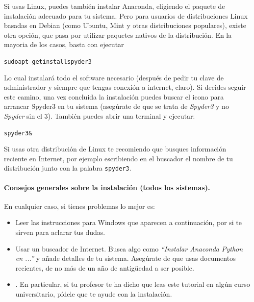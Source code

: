 \documentclass[10pt,a4paper]{article}\usepackage[]{graphicx}\usepackage[]{color}
\makeatletter
\newenvironment{kframe}{%
 \def\at@end@of@kframe{}%
 \ifinner\ifhmode%
  \def\at@end@of@kframe{\end{minipage}}%
  \begin{minipage}{\columnwidth}%
 \fi\fi%
 \def\FrameCommand##1{\hskip\@totalleftmargin \hskip-\fboxsep
 \colorbox{shadecolor}{##1}\hskip-\fboxsep
     \hskip-\linewidth \hskip-\@totalleftmargin \hskip\columnwidth}%
 \MakeFramed {\advance\hsize-\width
   \@totalleftmargin\z@ \linewidth\hsize
   \@setminipage}}%
 {\par\unskip\endMakeFramed%
 \at@end@of@kframe}
\newenvironment{knitrout}{}{} %
\newcounter {cont01}
\makeatother
\begin{document}
Si usas Linux, puedes también instalar Anaconda, eligiendo el paquete de instalación adecuado para tu sistema. Pero para usuarios de distribuciones Linux basadas en Debian (como Ubuntu, Mint y otras distribuciones populares), existe otra opción, que pasa por utilizar  paquetes nativos de la distribución. En la mayoria de los casos, basta con ejecutar
\begin{knitrout}
\color{fgcolor}\begin{kframe}
\begin{alltt}
sudo apt-get install spyder3
\end{alltt}
\end{kframe}
\end{knitrout}
Lo cual instalará todo el software necesario (después de pedir tu clave de administrador y siempre que tengas conexión a internet, claro). Si decides seguir este camino, una vez concluida la instalación puedes buscar el icono para arrancar Spyder3 en tu sistema (asegúrate de que se trata de {\em Spyder3} y no {\em Spyder} sin el 3). También puedes abrir una terminal y ejecutar:
\begin{knitrout}
\color{fgcolor}\begin{kframe}
\begin{alltt}
spyder3 &
\end{alltt}
\end{kframe}
\end{knitrout}
Si usas otra distribución de Linux te recomiendo que busques información reciente en Internet, por ejemplo escribiendo en el buscador el nombre de tu distribución junto con la palabra {\tt spyder3}. 


\paragraph{Consejos generales sobre la instalación (todos los sistemas).}

En cualquier caso, si tienes problemas lo mejor es:
\begin{itemize}
  \item Leer las instrucciones para Windows que aparecen a continuación, por si te sirven para aclarar tus dudas.
  \item Usar un buscador de Internet. Busca algo como {\em ``Instalar Anaconda Python en ...''} y añade detalles de tu sistema. Asegúrate de que usas documentos recientes, de no más de un año de antigüedad a ser posible.
  \item {}. En particular, si tu profesor te ha dicho que leas este tutorial en algún curso universitario, pídele que te ayude con la instalación.
\end{itemize}
\end{document}
